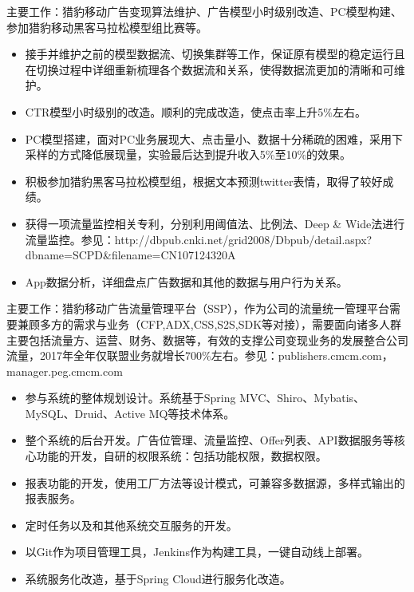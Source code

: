 \documentclass{resume}
\begin{document}
\begin{onehalfspacing}
主要工作：猎豹移动广告变现算法维护、广告模型小时级别改造、PC模型构建、参加猎豹移动黑客马拉松模型组比赛等。
\begin{itemize}
  \item 接手并维护之前的模型数据流、切换集群等工作，保证原有模型的稳定运行且在切换过程中详细重新梳理各个数据流和关系，使得数据流更加的清晰和可维护。 
  \item CTR模型小时级别的改造。顺利的完成改造，使点击率上升5\%左右。
  \item PC模型搭建，面对PC业务展现大、点击量小、数据十分稀疏的困难，采用下采样的方式降低展现量，实验最后达到提升收入5\%至10\%的效果。
  \item 积极参加猎豹黑客马拉松模型组，根据文本预测twitter表情，取得了较好成绩。
  \item 获得一项流量监控相关专利，分别利用阈值法、比例法、Deep \& Wide法进行流量监控。参见：http://dbpub.cnki.net/grid2008/Dbpub/detail.aspx?dbname=SCPD\&filename=CN107124320A
  \item App数据分析，详细盘点广告数据和其他的数据与用户行为关系。
\end{itemize}
\end{onehalfspacing}


\begin{onehalfspacing}
主要工作：猎豹移动广告流量管理平台（SSP），作为公司的流量统一管理平台需要兼顾多方的需求与业务（CFP,ADX,CSS,S2S,SDK等对接），需要面向诸多人群主要包括流量方、运营、财务、数据等，有效的支撑公司变现业务的发展整合公司流量，2017年全年仅联盟业务就增长700\%左右。参见：publishers.cmcm.com，manager.peg.cmcm.com
\begin{itemize}
  \item 参与系统的整体规划设计。系统基于Spring MVC、Shiro、Mybatis、MySQL、Druid、Active MQ等技术体系。
  \item 整个系统的后台开发。广告位管理、流量监控、Offer列表、API数据服务等核心功能的开发，自研的权限系统：包括功能权限，数据权限。
  \item 报表功能的开发，使用工厂方法等设计模式，可兼容多数据源，多样式输出的报表服务。
  \item 定时任务以及和其他系统交互服务的开发。
  \item 以Git作为项目管理工具，Jenkins作为构建工具，一键自动线上部署。
  \item 系统服务化改造，基于Spring Cloud进行服务化改造。 
\end{itemize}
\end{onehalfspacing}
\end{document}
